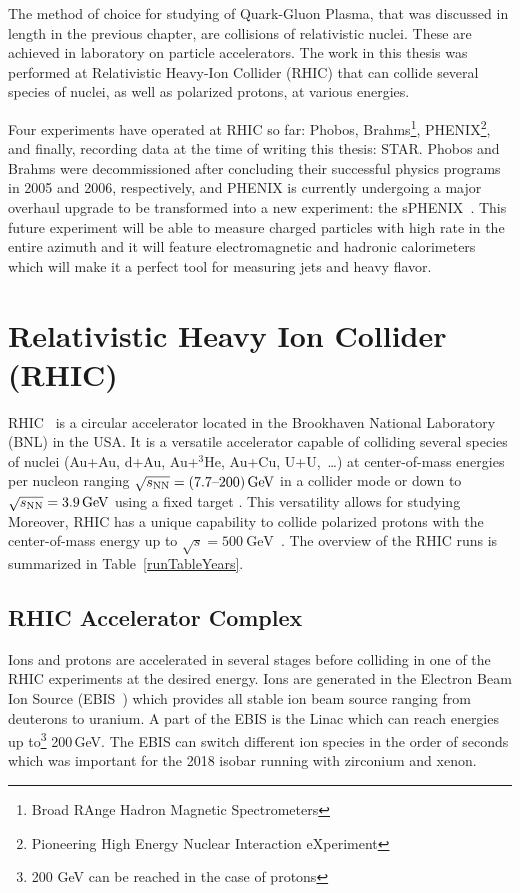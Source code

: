 The method of choice for studying of Quark-Gluon Plasma, that was discussed in length in the previous chapter, are collisions of relativistic nuclei. These are achieved in laboratory on particle accelerators. The work in this thesis was performed at Relativistic Heavy-Ion Collider (RHIC) that can collide several species of nuclei, as well as polarized protons, at various energies. 

Four experiments have operated at RHIC so far: Phobos, Brahms\footnote{Broad RAnge Hadron Magnetic Spectrometers}, PHENIX\footnote{Pioneering High Energy Nuclear Interaction eXperiment}, and finally, recording data at the time of writing this thesis: STAR. Phobos and Brahms were decommissioned after concluding their successful physics programs in 2005 and 2006, respectively, and PHENIX is currently undergoing a major overhaul upgrade to be transformed into a new experiment: the sPHENIX~\cite{sphenix}. This future experiment will be able to measure charged particles with high rate in the entire azimuth and it will feature electromagnetic and hadronic calorimeters which will make it a perfect tool for measuring jets and heavy flavor.

\section{Relativistic Heavy Ion Collider (RHIC)\label{RHIC}}

RHIC~\cite{RHICproject, RHICdesign} is a circular accelerator located in the Brookhaven National Laboratory 
(BNL) in the USA\@. It is a versatile accelerator capable of
colliding several species of nuclei (Au+Au, d+Au, Au+$^3$He, Au+Cu, U+U,~\dots) at
center-of-mass energies per nucleon
ranging $\sqrt{s_\text{NN}} = (\text{7.7--200})\,\si{\giga\electronvolt}$ in a collider mode or down to
$\sqrt{s_\text{NN}} = 3.9\,\si{\giga\electronvolt}$
using a fixed target \cite{fixedTarget}\@. This versatility allows for studying  Moreover, RHIC has a unique capability to collide polarized protons with
the center-of-mass energy up to $\sqrt{s} = \SI{500}{\giga\electronvolt}$~\cite{polarizedProtons}\@. The overview
of the RHIC runs is summarized in Table~\ref{runTableYears}\@.

\subsection{RHIC Accelerator Complex}
Ions and protons are accelerated in several stages before colliding in one of the RHIC experiments at the desired energy. Ions are generated in the Electron Beam Ion Source (EBIS~\cite{EBIS}) which provides all stable ion beam source ranging from deuterons to uranium. A part of the EBIS is the Linac which can reach energies up to\footnote{200 GeV can be reached in the case of protons} 200$\,$GeV\@. The EBIS can switch different ion species in the order of seconds which was important for the 2018 isobar running with zirconium and xenon.


